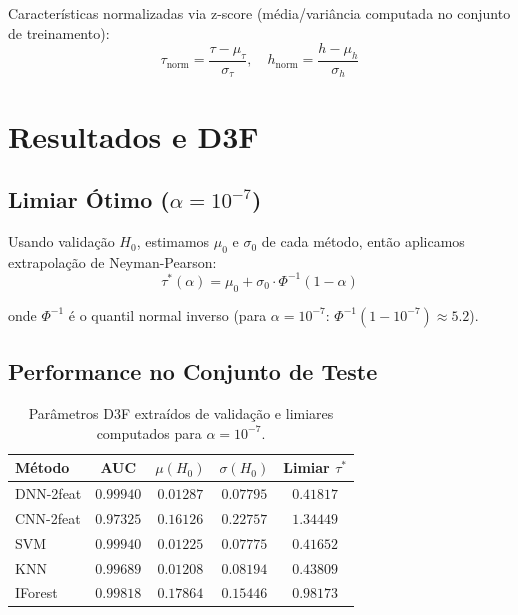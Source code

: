 \documentclass[10pt, a4paper]{article}
\begin{document}
Características normalizadas via z-score (média/variância computada no conjunto de treinamento):
$$\tau_{\mathrm{norm}} = \frac{\tau - \mu_\tau}{\sigma_\tau}, \quad h_{\mathrm{norm}} = \frac{h - \mu_h}{\sigma_h}$$

\section{Resultados e D3F}

\subsection{Limiar Ótimo ($\alpha = 10^{-7}$)}

Usando validação $H_0$, estimamos $\mu_0$ e $\sigma_0$ de cada método, então aplicamos extrapolação de Neyman-Pearson:
$$\tau^*(\alpha) = \mu_0 + \sigma_0 \cdot \Phi^{-1}(1 - \alpha)$$

onde $\Phi^{-1}$ é o quantil normal inverso (para $\alpha = 10^{-7}$: $\Phi^{-1}(1-10^{-7}) \approx 5.2$).

\subsection{Performance no Conjunto de Teste}

\begin{table}[H]
\centering
\begin{tabular}{lcccc}
\toprule
\textbf{Método} & \textbf{AUC} & \textbf{$\mu(H_0)$} & \textbf{$\sigma(H_0)$} & \textbf{Limiar $\tau^*$} \\
\midrule
DNN-2feat & $0.99940$ & $0.01287$ & $0.07795$ & $0.41817$ \\
CNN-2feat & $0.97325$ & $0.16126$ & $0.22757$ & $1.34449$ \\
SVM & $0.99940$ & $0.01225$ & $0.07775$ & $0.41652$ \\
KNN & $0.99689$ & $0.01208$ & $0.08194$ & $0.43809$ \\
IForest & $0.99818$ & $0.17864$ & $0.15446$ & $0.98173$ \\
\bottomrule
\end{tabular}
\caption{Parâmetros D3F extraídos de validação e limiares computados para $\alpha = 10^{-7}$.}
\end{table}
\end{document}

